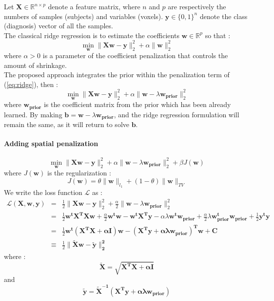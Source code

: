 \documentclass[12pt]{article}
\newcommand{\B}[1]{\mathbf{#1}}
\begin{document}
Let $\B X \in \mathbb{R}^{n \times p}$ denote a feature matrix, where $n$ and $p$ are respectively the numbers of samples (subjects) and variables (voxels).
$\B y \in \{0, 1\}^{n} $ denote the class (diagnosis) vector of all the samples.
\\
The classical ridge regression is to estimate the coefficients $\B w \in \mathbb{R}^{p}$ so that :
\begin{equation}
	\min_{\B w} \| \B{Xw - y} \|_2^2 + \alpha \|\B w\|_2^2
	\label{eq:ridge}
\end{equation}
where $\alpha > 0$ is a parameter of the coefficient penalization that controls the amount of shrinkage.
\\
The proposed approach integrates the prior within the penalization term of (\ref{eq:ridge}), then :
\begin{equation}
	\min_{\B w} \| \B{Xw - y} \|_2^2 + \alpha \|\B w - \lambda \B{ w_{prior}}\|_2^2
\end{equation}
where $\B{ w_{prior}}$ is the coefficient matrix from the prior which has been already learned.
By making $\B b = \B w - \lambda \B{ w_{prior}}$, and the ridge regression formulation will remain the same, as it will return to solve $\B b$.

\paragraph{Adding spatial penalization}
\begin{equation}
	\min_{\B w} \| \B{Xw - y} \|_2^2 + \alpha \|\B w - \lambda \B{ w_{prior}}\|_2^2 + \beta J(\B w)
\end{equation}
where $J(\B w)$ is the regularization :
\begin{equation}
	J(\B w) = \theta \| \B w \|_{{l}_1} + (1-\theta)\| \B w \|_{TV}
\end{equation}
We write the loss function $\mathcal{L}$ as :
\begin{eqnarray*}
	\mathcal{L}(\B{X, w, y}) & = & \frac{1}{2} \| \B{Xw - y} \|_2^2 + \frac{\alpha}{2} \|\B w - \lambda \B{ w_{prior}}\|_2^2 \\
	& = & \frac{1}{2}\B{w^tX^TXw} + \frac{\alpha}{2} \B{w^tw} - \B{w^tX^Ty} - \alpha \lambda \B{w^tw_{prior}} + \frac{\alpha}{2} \lambda \B{w_{prior}^tw_{prior}} + \frac{1}{2}\B{y^ty} \\
	& = & \frac{1}{2} \B{ w^t (X^T X+\alpha I) w - (X^T y + \alpha \lambda w_{prior})^T w + C} \\
	& \equiv & \frac{1}{2} \B{\| \tilde{X}w - \tilde{y} \|_2^2}
\end{eqnarray*}
where :
\begin{equation}
	\B{ \tilde{X} = \sqrt{X^TX+\alpha I}}
\end{equation}
and 
\begin{equation}
	\B{ \tilde{y} = \tilde{X}^{-1}(X^Ty+\alpha \lambda w_{prior})
	}
\end{equation}
\end{document}
